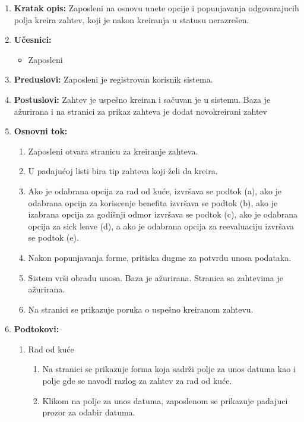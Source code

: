 \documentclass[a4paper]{article}
\begin{document}
\begin{enumerate}
    \item \textbf{Kratak opis:} Zaposleni na osnovu unete opcije i popunjavanja odgovarajucih polja kreira zahtev, koji je nakon kreiranja u statusu nerazrešen.
    \item \textbf{Učesnici:}
        \begin{itemize}
            \item Zaposleni
        \end{itemize}
    \item \textbf{Preduslovi:} Zaposleni je registrovan korisnik sistema.
    \item \textbf{Postuslovi:} Zahtev je uspešno kreiran i sačuvan je u sistemu. Baza je ažurirana i na stranici za prikaz zahteva je dodat novokreirani zahtev
    \item \textbf{Osnovni tok:}
        \begin{enumerate}
            \item Zaposleni otvara stranicu za kreiranje zahteva.
            \item U padajućoj listi bira tip zahteva koji želi da kreira.
            \item Ako je odabrana opcija za rad od kuće, izvršava se podtok (a), ako je odabrana opcija za koriscenje benefita izvršava se podtok (b), ako je izabrana opcija za godišnji odmor izvršava se podtok (c), ako je odabrana opcija za sick leave (d), a ako je odabrana opcija za reevaluaciju izvršava se podtok (e).
            \item Nakon popunjavanja forme, pritiska dugme za potvrdu unosa podataka.
            \item Sistem vrši obradu unosa. Baza je ažurirana. Stranica sa zahtevima je ažurirana.
            \item Na stranici se prikazuje poruka o uspešno kreiranom zahtevu.
        \end{enumerate}
    \item \textbf{Podtokovi:}
        \begin{enumerate}
            \item Rad od kuće
            \begin{enumerate}
                \item Na stranici se prikazuje forma koja sadrži polje za unos datuma kao i polje gde se navodi razlog za zahtev za rad od kuće.
                \item Klikom na polje za unos datuma, zaposlenom se prikazuje padajuci prozor za odabir datuma.

\end{enumerate}
\end{enumerate}
\end{enumerate}
\end{document}
